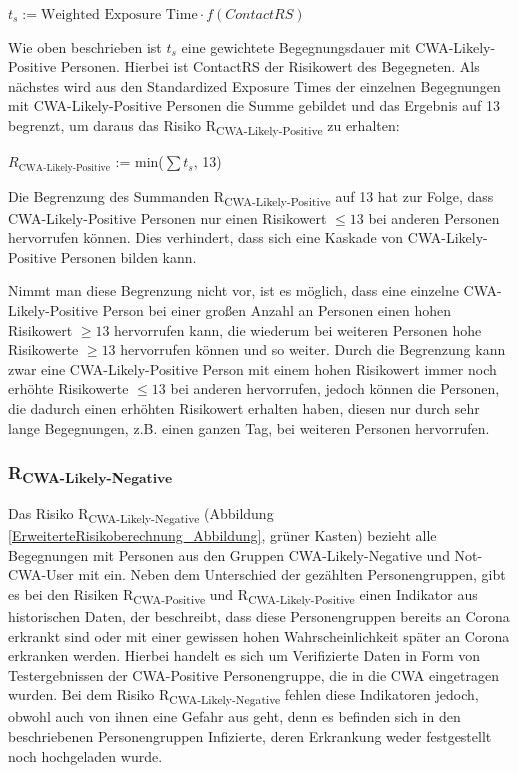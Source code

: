 \documentclass[conference,compsoc]{IEEEtran}
\begin{document}
\centerline{\text{ }}
\centerline{$t_s := \text{Weighted Exposure Time} \cdot f(ContactRS)$}
\centerline{\text{ }}

Wie oben beschrieben ist $t_s$ eine gewichtete Begegnungsdauer mit CWA-Likely-Positive Personen.
Hierbei ist ContactRS der Risikowert des Begegneten.
Als nächstes wird aus den Standardized Exposure Times der einzelnen Begegnungen mit CWA-Likely-Positive Personen die Summe gebildet und das Ergebnis auf 13 begrenzt, 
um daraus das Risiko R\textsubscript{CWA-Likely-Positive} zu erhalten:

\centerline{\text{ }}
\centerline{$R_{\text{CWA-Likely-Positive}}$ := min($\sum t_s$, 13)}
\centerline{\text{ }}

Die Begrenzung des Summanden R\textsubscript{CWA-Likely-Positive} auf 13 hat zur Folge, 
dass CWA-Likely-Positive Personen nur einen Risikowert $\le 13$ bei anderen Personen hervorrufen können. 
Dies verhindert, dass sich eine Kaskade von CWA-Likely-Positive Personen bilden kann. 

Nimmt man diese Begrenzung nicht vor, ist es möglich, 
dass eine einzelne CWA-Likely-Positive Person bei einer großen Anzahl an Personen einen hohen Risikowert $\geq 13$ hervorrufen kann, 
die wiederum bei weiteren Personen hohe Risikowerte $\geq 13$ hervorrufen können und so weiter. 
Durch die Begrenzung kann zwar eine CWA-Likely-Positive Person mit einem hohen Risikowert immer noch erhöhte Risikowerte $\leq 13$ bei anderen hervorrufen, 
jedoch können die Personen, die dadurch einen erhöhten Risikowert erhalten haben, 
diesen nur durch sehr lange Begegnungen, z.B. einen ganzen Tag, bei weiteren Personen hervorrufen.\\

\subsubsection{R\textsubscript{CWA-Likely-Negative}}
\label{CWALikelyNegative}

Das Risiko R\textsubscript{CWA-Likely-Negative} (Abbildung \ref{ErweiterteRisikoberechnung_Abbildung}, grüner Kasten) 
bezieht alle Begegnungen mit Personen aus den Gruppen CWA-Likely-Negative und Not-CWA-User mit ein.
Neben dem Unterschied der gezählten Personengruppen, gibt es bei den  Risiken R\textsubscript{CWA-Positive} und 
R\textsubscript{CWA-Likely-Positive} einen Indikator aus historischen Daten, 
der beschreibt, dass diese Personengruppen bereits an Corona erkrankt sind oder mit einer gewissen hohen Wahrscheinlichkeit später an Corona erkranken werden. 
Hierbei handelt es sich um Verifizierte Daten in Form von Testergebnissen der CWA-Positive Personengruppe, die in die CWA eingetragen wurden.
Bei dem Risiko R\textsubscript{CWA-Likely-Negative} fehlen diese Indikatoren jedoch, obwohl auch von ihnen eine Gefahr aus geht,
denn es befinden sich in den beschriebenen Personengruppen Infizierte, deren Erkrankung weder festgestellt noch hochgeladen wurde.
\end{document}
